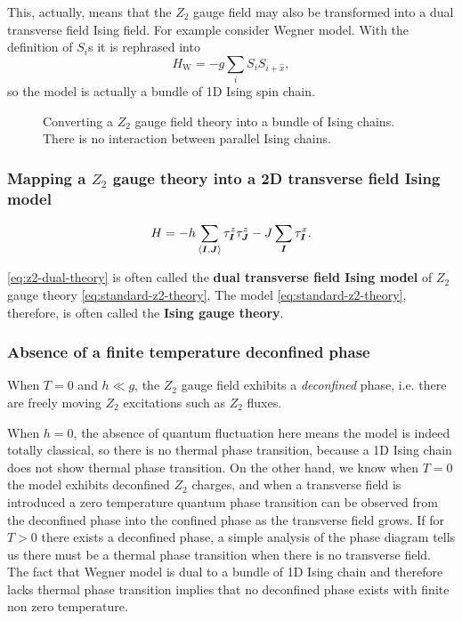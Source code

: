 \documentclass[hyperref, a4paper]{article}
\newcommand*{\pair}[1]{\langle #1 \rangle}
\newcommand*{\concept}[1]{{\textbf{#1}}}
\newcommand*{\Ztwo}{$\mathbb{Z}_2$ }
\newcommand*{\tfim}{transverse field Ising model}
\def\mathbb#1{#1}%
\begin{document}
This, actually, means that the \Ztwo gauge field may also be transformed into a dual transverse field Ising field.
For example consider Wegner model.
With the definition of $S_i$s it is rephrased into
\begin{equation}
    H_\text{W} = -g \sum_i S_i S_{i+\hat{x}},
\end{equation}
so the model is actually a bundle of 1D Ising spin chain.

\begin{figure}
    \centering
    
    \caption{Converting a \Ztwo gauge field theory into a bundle of Ising chains. There is no interaction between parallel Ising chains.}
\end{figure}

\subsubsection{Mapping a \Ztwo gauge theory into a 2D \tfim{}}

\begin{equation}
    H = - h \sum_{\pair{\vb*{I}, \vb*{J}}} \tau^z_{\vb*{I}} \tau^z_{\vb*{J}} - J \sum_{\vb*{I}} \tau^x_{\vb*{I}}.
    \label{eq:z2-dual-theory}
\end{equation}

\eqref{eq:z2-dual-theory} is often called the \concept{dual \tfim{}} of \Ztwo gauge theory \eqref{eq:standard-z2-theory}.
The model \eqref{eq:standard-z2-theory}, therefore, is often called the \concept{Ising gauge theory}.

\subsubsection{Absence of a finite temperature deconfined phase}\label{sec:absence-of-z2-deconfined-phase}

When $T=0$ and $h \ll g$, the \Ztwo gauge field exhibits a \emph{deconfined} phase, i.e. there are freely moving \Ztwo excitations such as \Ztwo fluxes.

When $h = 0$, the absence of quantum fluctuation here means the model is indeed totally classical, so there is no thermal phase transition, because a 1D Ising chain does not show thermal phase transition.
On the other hand, we know when $T=0$ the model exhibits deconfined \Ztwo charges, and when a transverse field is introduced a zero temperature quantum phase transition can be observed from the deconfined phase into the confined phase as the transverse field grows.
If for $T > 0$ there exists a deconfined phase, a simple analysis of the phase diagram tells us there must be a thermal phase transition when there is no transverse field.
The fact that Wegner model is dual to a bundle of 1D Ising chain and therefore lacks thermal phase transition implies that no deconfined phase exists with finite non zero temperature.
\end{document}
